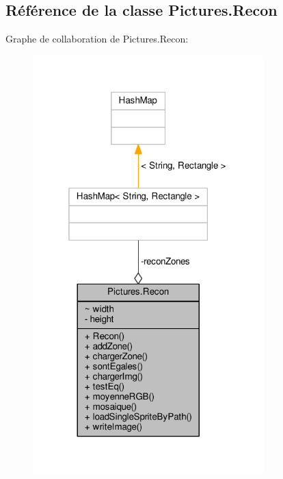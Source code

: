 \hypertarget{classPictures_1_1Recon}{}\subsection{Référence de la classe Pictures.\+Recon}
\label{classPictures_1_1Recon}


Graphe de collaboration de Pictures.\+Recon\+:\nopagebreak
\begin{figure}[H]
\begin{center}
\leavevmode
\includegraphics[width=253pt]{classPictures_1_1Recon__coll__graph}
\end{center}
\end{figure}
